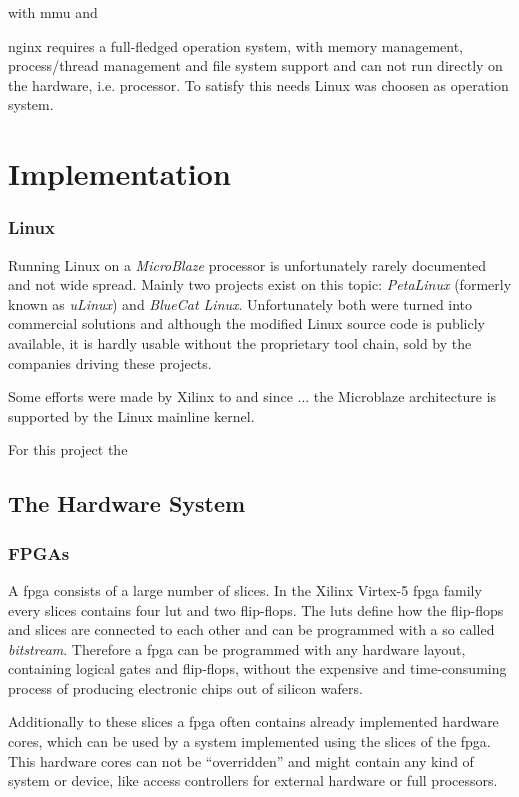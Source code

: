with \gls{mmu} and 

nginx requires a full-fledged operation system, with memory management, process/thread management and file system support and can not run directly on the hardware, i.e. processor. To satisfy this needs Linux was choosen as operation system. 

\chapter{Implementation}

\subsection{Linux}

Running Linux on a \textit{MicroBlaze} processor is unfortunately rarely documented and not wide spread. Mainly two projects exist on this topic: \textit{PetaLinux} (formerly known as \textit{uLinux}) and \textit{BlueCat Linux}. Unfortunately both were turned into commercial solutions and although the modified Linux source code is publicly available, it is hardly usable without the proprietary tool chain, sold by the companies driving these projects.

Some efforts were made by Xilinx to and since ... the Microblaze architecture is supported by the Linux mainline kernel.

For this project the 


\section{The Hardware System}

\subsection{FPGAs}

A \gls{fpga} consists of a large number of slices. In the Xilinx Virtex-5 \gls{fpga} family every slices contains four \gls{lut} and two flip-flops. The \gls{lut}s define how the flip-flops and slices are connected to each other and can be programmed with a so called \textit{bitstream}. Therefore a \gls{fpga} can be programmed with any hardware layout, containing logical gates and flip-flops, without the expensive and time-consuming process of producing electronic chips out of silicon wafers.

Additionally to these slices a \gls{fpga} often contains already implemented hardware cores, which can be used by a system implemented using the slices of the \gls{fpga}. This hardware cores can not be "`overridden"' and might contain any kind of system or device, like access controllers for external hardware or full processors.

